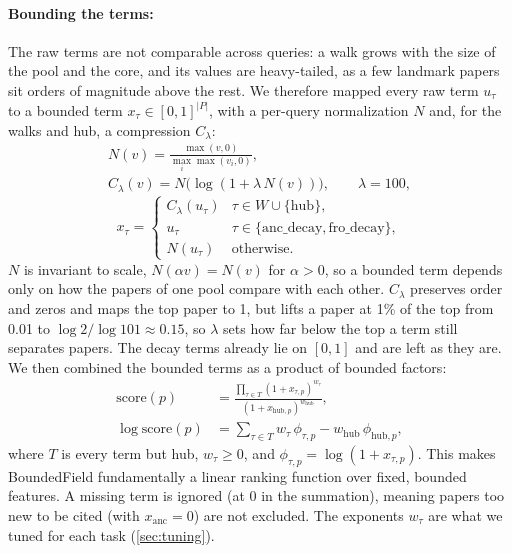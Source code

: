 \paragraph{Bounding the terms:}
The raw terms are not comparable across queries: a walk grows with the size of the pool and the core, and its values are heavy-tailed, as a few landmark papers sit orders of magnitude above the rest. We therefore mapped every raw term $u_\tau$ to a bounded term $x_\tau \in [0,1]^{|P|}$, with a per-query normalization $N$ and, for the walks and hub, a compression $C_\lambda$:
\begin{gather*}
    N(v) = \frac{\max(v,0)}{\max_i \max(v_i,0)}, \\
    C_\lambda(v) = N\bigl(\log(1 + \lambda\,N(v))\bigr), \qquad \lambda = 100,
\end{gather*}
\begin{equation*}
    x_\tau =
    \begin{cases}
        C_\lambda(u_\tau) & \tau \in W \cup \{\text{hub}\}, \\
        u_\tau & \tau \in \{\text{anc\_decay}, \text{fro\_decay}\}, \\
        N(u_\tau) & \text{otherwise}.
    \end{cases}
\end{equation*}
$N$ is invariant to scale, $N(\alpha v) = N(v)$ for $\alpha > 0$, so a bounded term depends only on how the papers of one pool compare with each other. $C_\lambda$ preserves order and zeros and maps the top paper to 1, but lifts a paper at 1\% of the top from 0.01 to $\log 2 / \log 101 \approx 0.15$, so $\lambda$ sets how far below the top a term still separates papers. The decay terms already lie on $[0,1]$ and are left as they are. We then combined the bounded terms as a product of bounded factors:
\begin{equation}
    \label{eq:bf}
    \begin{aligned}
        \mathrm{score}(p) &= \frac{\prod_{\tau \in T} \left(1 + x_{\tau,p}\right)^{w_\tau}}{\left(1 + x_{\text{hub},p}\right)^{w_{\text{hub}}}}, \\
        \log \mathrm{score}(p) &= \sum_{\tau \in T} w_\tau \,\phi_{\tau,p} - w_{\text{hub}}\, \phi_{\text{hub},p},
    \end{aligned}
\end{equation}
where $T$ is every term but hub, $w_\tau \geq 0$, and $\phi_{\tau,p} = \log(1 + x_{\tau,p})$. This makes BoundedField fundamentally a linear ranking function over fixed, bounded features. A missing term is ignored (at 0 in the summation), meaning papers too new to be cited (with $x_{\text{anc}} = 0$) are not excluded. The exponents $w_\tau$ are what we tuned for each task (\cref{sec:tuning}).

